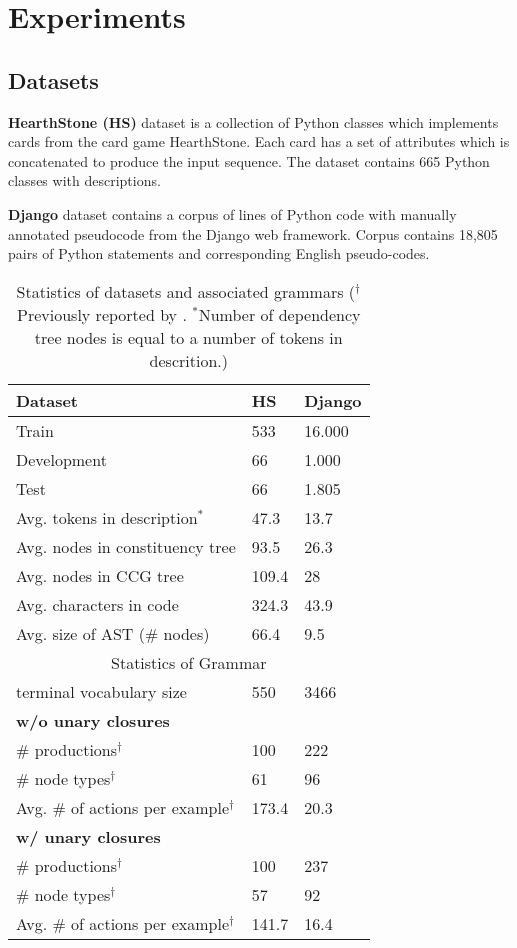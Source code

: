 \chapter{Experiments} \label{Chapter5} 

\section{Datasets}
\textbf{HearthStone (HS)}  dataset \parencite{Ling2016} is a collection of Python classes which implements cards from the card game HearthStone. Each card has a set of attributes which is concatenated to produce the input sequence. The dataset contains 665 Python classes with descriptions.

\textbf{Django} dataset \parencite{Oda2015} contains a corpus of lines of Python code with manually annotated pseudocode from the Django web framework. Corpus contains 18,805 pairs of Python statements and corresponding English pseudo-codes. 

\begin{table}
\centering
\begin{tabular}{ l l l }
\hline
\textbf{Dataset} & \textbf{HS} & \textbf{Django} \\
\hline 
Train & 533 & 16.000 \\ 
Development & 66 & 1.000 \\ 
Test & 66 & 1.805 \\ 
\hline
Avg. tokens in description$^*$ & 47.3 & 13.7 \\
Avg. nodes in constituency tree & 93.5 & 26.3 \\
Avg. nodes in CCG tree & 109.4 & 28 \\
Avg. characters in code & 324.3 & 43.9 \\
Avg. size of AST (\# nodes) & 66.4 & 9.5 \\
 \hline
 \hline
\multicolumn{3}{c}{Statistics of Grammar} \\
terminal vocabulary size & 550 & 3466 \\ 
\hline
\multicolumn{3}{l}{\textbf{w/o unary closures}} \\
\# productions$^\dagger$ & 100 & 222 \\
\# node types$^\dagger$ & 61 & 96 \\
Avg. \# of actions per example$^\dagger$ & 173.4 & 20.3 \\ 
\hline
\multicolumn{3}{l}{\textbf{w/ unary closures}} \\
\# productions$^\dagger$ & 100 & 237 \\
\# node types$^\dagger$ & 57 & 92 \\
Avg. \# of actions per example$^\dagger$ & 141.7 & 16.4 \\ 
\hline
\end{tabular}
\caption[Statistics of datasets]{Statistics of datasets and associated grammars ($^\dagger$Previously reported by \cite{Yin2017}. $^*$Number of dependency tree nodes is equal to a number of tokens in descrition.)}
\end{table}

